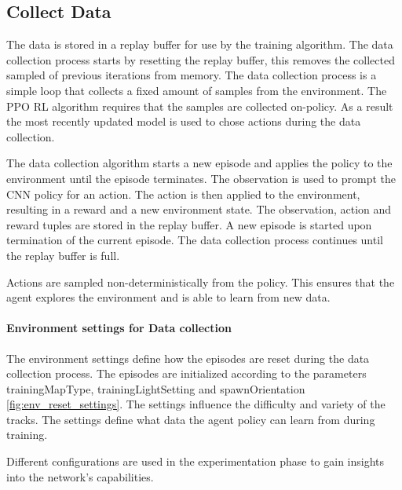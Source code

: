 \subsection{Collect Data}

The data is stored in a replay buffer for use by the training algorithm. The data collection process starts by resetting the replay buffer, this removes the collected sampled of previous iterations from memory.
The data collection process is a simple loop that collects a fixed amount of samples from the environment. The \ac{PPO} \ac{RL} algorithm requires that the samples are collected on-policy. As a result the most recently updated model is used to chose actions during the data collection. 

The data collection algorithm starts a new episode and applies the policy to the environment until the episode terminates. The observation is used to prompt the \ac{CNN} policy for an action. The action is then applied to the environment, resulting in a reward and a new environment state. The observation, action and reward tuples are stored in the replay buffer. A new episode is started upon termination of the current episode. The data collection process continues until the replay buffer is full.

Actions are sampled non-deterministically from the policy. This ensures that the agent explores the environment and is able to learn from new data.

\paragraph{Environment settings for Data collection}

The environment settings define how the episodes are reset during the data collection process. The episodes are initialized according to the parameters trainingMapType, trainingLightSetting and spawnOrientation \ref{fig:env_reset_settings}. The settings influence the difficulty and variety of the tracks. The settings define what data the agent policy can learn from during training.

Different configurations are used in the experimentation phase to gain insights into the network's capabilities.


